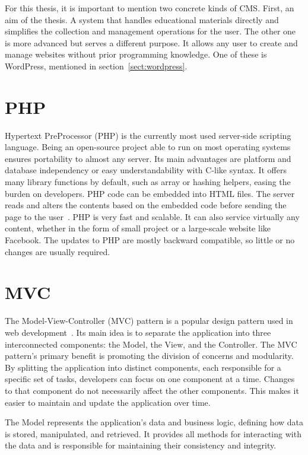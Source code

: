 \documentclass[
  digital,     %
  oneside,     %
  nosansbold,  %
  colorbold, %
  lof,         %
  lot,         %
]{fithesis4}
\begin{document}
For this thesis, it is important to mention two concrete kinds of CMS. First, an aim
of the thesis. A system that handles educational materials directly and simplifies
the collection and management operations for the user. The other one is more advanced
but serves a different purpose. It allows any user to create and manage websites
without prior programming knowledge. One of these is WordPress, mentioned in
section~\ref{sect:wordpress}.

\section{PHP}

Hypertext PreProcessor (PHP) is the currently most used \mbox{server-side} scripting
language. Being an \mbox{open-source} project able to run on most operating systems
ensures portability to almost any server. Its main advantages are platform and database
independency or easy understandability with \mbox{C-like} syntax. It offers many
library functions by default, such as array or hashing helpers, easing the burden
on developers. PHP code can be embedded into HTML files. The server reads and
alters the contents based on the embedded code before sending the page to the
user~\parencite[page.~30]{welling17}. PHP is very fast and scalable. It can also
service virtually any content, whether in the form of small project or
a \mbox{large-scale} website like Facebook. The updates to PHP are mostly backward
compatible, so little or no changes are usually required.

\section{MVC}

The Model-View-Controller (MVC) pattern is a popular design pattern used in web development~\cite{MVC}. Its main idea is to separate the application into three interconnected components: the Model, the View, and the Controller. The MVC pattern's primary benefit is promoting the division of concerns and modularity. By splitting the application into distinct components, each responsible for a specific set of tasks, developers can focus on one component at a time. Changes to that component do not necessarily affect the other components. This makes it easier to maintain and update the application over time.

The Model represents the application's data and business logic, defining how data is stored, manipulated, and retrieved. It provides all methods for interacting with the data and is responsible for maintaining their consistency and integrity.
\end{document}

